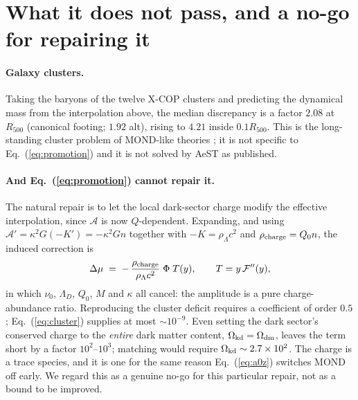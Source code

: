 \documentclass[aps,prd,twocolumn,superscriptaddress,nofootinbib,floatfix]{revtex4-2}
\newcommand{\Acal}{\mathcal{A}}
\newcommand{\Fcal}{\mathcal{F}}
\begin{document}
\section{What it does not pass, and a no-go for repairing it}

\paragraph*{Galaxy clusters.} Taking the baryons of the twelve X-COP clusters
\cite{Eckert2019,Ettori2019} and predicting the dynamical mass from the interpolation above, the
median discrepancy is a factor $2.08$ at $R_{500}$ (canonical footing; $1.92$ alt), rising to
$4.21$ inside $0.1R_{500}$. This is the long-standing cluster problem of MOND-like theories
\cite{FamaeyMcGaugh2012}; it is not specific to Eq.~(\ref{eq:promotion}) and it is not solved by
AeST as published.

\paragraph*{And Eq.~(\ref{eq:promotion}) cannot repair it.} The natural repair is to let the
local dark-sector charge modify the effective interpolation, since $\Acal$ is now
$Q$-dependent. Expanding, and using $\Acal' = \kappa^{2}G(-K') = -\kappa^{2}G n$ together with
$-K = \rho_{\Lambda}c^{2}$ and $\rho_{\rm charge} = Q_{0}n$, the induced correction is
\begin{equation}
  \Delta\mu \;=\; -\,\frac{\rho_{\rm charge}}{\rho_{\Lambda}c^{2}}\;\Phi\;T(y),
  \qquad T = y\,\Fcal''(y),
  \label{eq:cluster}
\end{equation}
in which $\nu_{0}$, $\Lambda_{D}$, $Q_{0}$, $M$ and $\kappa$ all cancel: the amplitude is a pure
charge-abundance ratio. Reproducing the cluster deficit requires a coefficient of order
$0.5$; Eq.~(\ref{eq:cluster}) supplies at most $\sim 10^{-9}$. Even setting the dark sector's
conserved charge to the \emph{entire} dark matter content, $\Omega_{\rm kd} = \Omega_{\rm dm}$,
leaves the term short by a factor $10^{2}$--$10^{3}$; matching would require $\Omega_{\rm kd}
\sim 2.7\times10^{2}$. The charge is a trace species, and it is one for the same reason
Eq.~(\ref{eq:a0z}) switches MOND off early. We regard this as a genuine no-go for this
particular repair, not as a bound to be improved.
\end{document}
